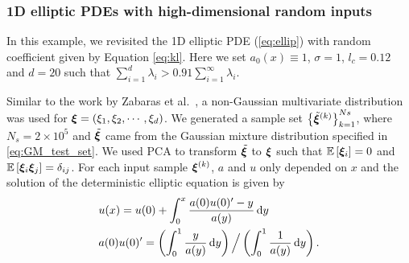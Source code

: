 \subsubsection{1D elliptic \acp{PDE} with high-dimensional random inputs}
In this example, we revisited the 1D elliptic \ac{PDE} (\ref{eq:ellip})
with random coefficient given by Equation \eqref{eq:kl}. 
Here we set $a_0(x) \equiv 1$, $\sigma = 1$, $l_c=0.12$ and $d=20$ such that $\sum_{i=1}^d\lambda_i > 0.91\sum_{i=1}^{\infty}\lambda_i$. 

Similar to the work by Zabaras et al.\ \cite{Zabaras_2014}, a non-Gaussian multivariate distribution was used for $\bm\xi = \left(\xi_1, \xi_2, \cdots, \xi_d\right)$.
We generated a sample set $\left\{\tilde{\bm\xi}^{(k)}\right\}_{k=1}^{Ns}$, where $N_s = 2\times 10^5$ and $\tilde{\bm\xi}$ came from the Gaussian mixture distribution specified in \eqref{eq:GM_test_set}.
We used \ac{PCA} to transform $\tilde{\bm\xi}$ to $\bm\xi$ such that $\mathbb{E}\left[\bm\xi_i\right] = 0$ and $\mathbb{E}\left[\bm\xi_i \bm\xi_j\right] = \delta_{ij}$.
For each input sample $\bm\xi^{(k)}$, $a$ and $u$ only depended on $x$ and the solution of the deterministic elliptic equation is given by \cite{Yang_2013reweightedL1}
\begin{equation}\label{eq:ellip_sol}
  \begin{split}
    & u(x) = u(0) + \int_0^x \dfrac{a(0)u(0)'-y}{a(y)}\,\mathrm{d} y \\
    & a(0)u(0)' = \left(\int_0^1 \dfrac{y}{a(y)}\,\mathrm{d} y\right) \Big / \left(\int_0^1 \dfrac{1}{a(y)}\,\mathrm{d} y\right).
  \end{split}
\end{equation}

